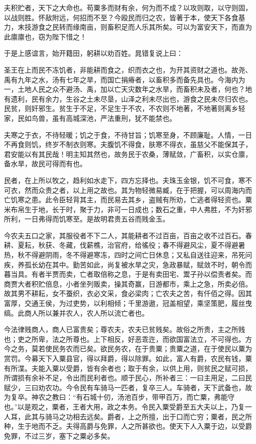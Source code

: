 \documentclass[]{article}
\begin{document}
夫积贮者，天下之大命也。苟粟多而财有余，何为而不成？以攻则取，以守则固，以战则胜。怀敌附远，何招而不至？今殴民而归之农，皆著于本，使天下各食基力，末技游食之民转而缘南亩，则畜积足而人乐其所矣。可以为富安天下，而直为此廪廪也，窃为陛下惜之！

于是上感谊言，始开籍田，躬耕以劝百姓。晁错复说上曰：

圣王在上而民不冻饥者，非能耕而食之，织而衣之也，为开其资财之道也。故尧、禹有九年之水，汤有七年之旱，而国亡捐瘠者，以畜积多而备先具也。今海内为一，土地人民之众不避汤、禹，加以亡天灾数年之水旱，而畜积未及者，何也？地有遗利，民有余力，生谷之土未尽垦，山泽之利未尽出也，游食之民未尽归农也。民贫，则奸邪生。贫生于不足，不足生于不农，不农则不地著，不地著则离乡轻家，民如鸟兽，虽有高城深池，严法重刑，犹不能禁也。

夫寒之于衣，不待轻暖；饥之于食，不待甘旨；饥寒至身，不顾廉耻。人情，一日不再食则饥，终岁不制衣则寒。夫腹饥不得食，肤寒不得衣，虽慈父不能保其子，君安能以有其民哉！明主知其然也，故务民于农桑，薄赋敛，广畜积，以实仓廪，备水旱，故民可得而有也。

民者，在上所以牧之，趋利如水走下，四方忘择也。夫珠玉金银，饥不可食，寒不可衣，然而众贵之者，以上用之故也。其为物轻微易臧，在于把握，可以周海内而亡饥寒之患。此令臣轻背其主，而民易去其乡，盗贼有所劝，亡逃者得轻资也。粟米布帛生于地，长于时，聚于力，非可一日成也；数石之重，中人弗胜，不为奸邪所利，一日弗得而饥寒至。是故明君贵五谷而贱金玉。

今农夫五口之家，其服役者不下二人，其能耕者不过百亩，百亩之收不过百石。春耕、夏耘，秋获、冬藏，伐薪樵，治官府，给徭役；春不得避风尘，夏不得避暑热，秋不得避阴雨，冬不得避寒冻，四时之间亡日休息；又私自送往迎来，吊死问疾，养孤长幼在其中。勤苦如此，尚复被水旱之灾，急政暴赋，赋敛不时，朝令而暮当具。有者半贾而卖，亡者取倍称之息，于是有卖田宅、鬻子孙以偿责者矣。而商贾大者积贮倍息，小者坐列贩卖，操其奇赢，日游都市，乘上之急，所卖必倍。故其男不耕耘，女不蚕织，衣必文采，食必梁肉；亡农夫之苦，有仟佰之得。因其富厚，交通王侯，为过吏势，以利相倾；千里游遨，冠盖相望，乘坚策肥，履丝曳缟。此商人所以兼并农人，农人所以流亡者也。

今法律贱商人，商人已富贵矣；尊农夫，农夫已贫贱矣。故俗之所贵，主之所贱也；吏之所卑，法之所尊也。上下相反，好恶乖迕，而欲国富法立，不可得也。方今之务，莫若使民务农而已矣。欲民务农，在于贵粟；贵粟之道，在于使民以粟为赏罚。今募天下入粟县官，得以拜爵，得以除罪。如此，富人有爵，农民有钱，粟有所渫。夫能入粟以受爵，皆有余者也；取于有余，以供上用，则贫民之赋可损，所谓损有余补不足，令出而民利者也。顺于民心，所补者三：一曰主用足，二曰民赋少，三曰劝农功。今令民有车骑马一匹者，复卒三人。车骑者，天下武备也，故为复卒。神农之教曰：``有石城十仞，汤池百步，带甲百万，而亡粟，弗能守也。''以是观之，粟者，王者大用，政之本务。令民入粟受爵至五大夫以上，乃复一人耳，此其与骑马之功相去远矣。爵者，上之所擅，出于口而亡穷；粟者，民之所种，生于地而不乏。夫得高爵与免罪，人之所甚欲也。使天下人入粟于边，以受爵免罪，不过三岁，塞下之粟必多矣。
\end{document}

